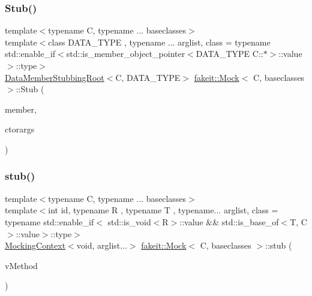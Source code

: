 \mbox{\label{classfakeit_1_1Mock_ae210824251ca071933f8a651bbe56047}} 
\subsubsection{\texorpdfstring{Stub()}{Stub()}\hspace{0.1cm}{\footnotesize\ttfamily [9/9]}}
{\footnotesize\ttfamily template$<$typename C, typename ... baseclasses$>$ \\
template$<$class D\+A\+T\+A\+\_\+\+T\+Y\+PE , typename ... arglist, class  = typename std\+::enable\+\_\+if$<$std\+::is\+\_\+member\+\_\+object\+\_\+pointer$<$\+D\+A\+T\+A\+\_\+\+T\+Y\+P\+E C\+::$\ast$$>$\+::value$>$\+::type$>$ \\
\mbox{\hyperlink{classfakeit_1_1DataMemberStubbingRoot}{Data\+Member\+Stubbing\+Root}}$<$C, D\+A\+T\+A\+\_\+\+T\+Y\+PE$>$ \mbox{\hyperlink{classfakeit_1_1Mock}{fakeit\+::\+Mock}}$<$ C, baseclasses $>$\+::Stub (\begin{DoxyParamCaption}\item[{D\+A\+T\+A\+\_\+\+T\+Y\+PE C\+::$\ast$}]{member,  }\item[{const arglist \&...}]{ctorargs }\end{DoxyParamCaption})\hspace{0.3cm}{\ttfamily [inline]}}

\mbox{\label{classfakeit_1_1Mock_aeedcaacc82d12295f11c3fc454b75554}} 
\subsubsection{\texorpdfstring{stub()}{stub()}\hspace{0.1cm}{\footnotesize\ttfamily [59/72]}}
{\footnotesize\ttfamily template$<$typename C, typename ... baseclasses$>$ \\
template$<$int id, typename R , typename T , typename... arglist, class  = typename std\+::enable\+\_\+if$<$                std\+::is\+\_\+void$<$\+R$>$\+::value \&\& std\+::is\+\_\+base\+\_\+of$<$\+T, C$>$\+::value$>$\+::type$>$ \\
\mbox{\hyperlink{classfakeit_1_1MockingContext}{Mocking\+Context}}$<$void, arglist...$>$ \mbox{\hyperlink{classfakeit_1_1Mock}{fakeit\+::\+Mock}}$<$ C, baseclasses $>$\+::stub (\begin{DoxyParamCaption}\item[{R(T\+::$\ast$)(arglist...)}]{v\+Method }\end{DoxyParamCaption})\hspace{0.3cm}{\ttfamily [inline]}}

